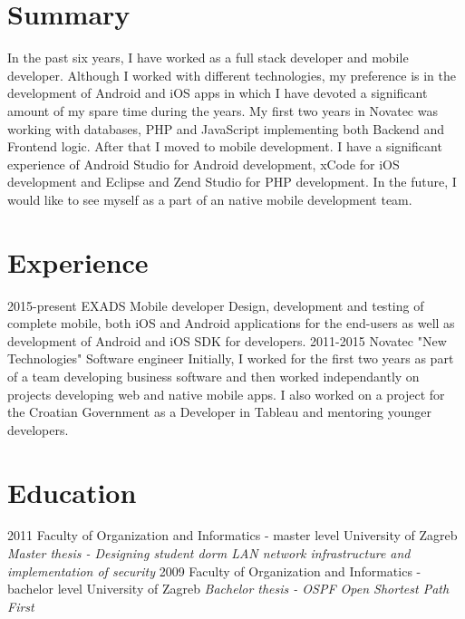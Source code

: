 \documentclass[print]{cv}
\begin{document}
\section{Summary}
In the past six years, I have worked as a full stack developer and mobile developer. Although I worked with different technologies, my preference is in the development of Android and iOS apps in which I have devoted a significant amount of my spare time during the years.  My first two years in Novatec was working with databases, PHP and JavaScript implementing both Backend and Frontend logic.  After that I moved to mobile development.  I have a significant experience of Android Studio for Android development, xCode for iOS development and Eclipse and Zend Studio for PHP development.  In the future, I would like to see myself as a part of an native mobile development team.



\section{Experience}
\begin{entrylist}
	\entry
	{2015-present}
	{EXADS}
	{Mobile developer}
	{Design, development and testing of complete mobile, both iOS and Android applications for the end-users as well as development of Android and iOS SDK for developers.}
	\entry
	{2011-2015}
	{Novatec "New Technologies"}
	{Software engineer}
	{Initially, I worked for the first two years as part of a team developing business software and then worked independantly on projects developing web and native mobile apps.  I also worked on a project for the Croatian Government as a Developer in Tableau and mentoring younger developers.}
\end{entrylist}



\section{Education}
\begin{entrylist}
	\entry
	{2011}
	{Faculty of Organization and Informatics - master level}
	{University of Zagreb}
	{\emph{Master thesis - Designing student dorm LAN network infrastructure and implementation of security}}
	\entry
	{2009}
	{Faculty of Organization and Informatics - bachelor level}
	{University of Zagreb}
	{\emph{Bachelor thesis - OSPF Open Shortest Path First}}
\end{entrylist}
\end{document}
